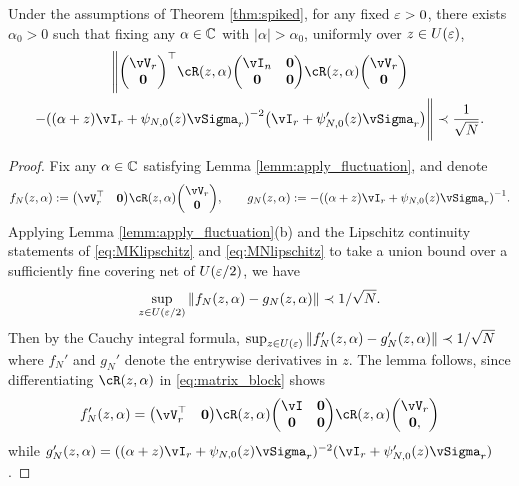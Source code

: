 \begin{lemma}\label{lemm:R(z,alph)^2}
Under the assumptions of Theorem
\ref{thm:spiked}, for any fixed $\varepsilon>0$, there exists $\alpha_0>0$ such
that fixing any $\alpha \in \mathbb{C}$ with $|\alpha|>\alpha_0$,
uniformly over $z \in U(\varepsilon)$,
\begin{multline*}
		\Bigg\|  \begin{pmatrix} \vV_r \\ \mathbf{0} \end{pmatrix}^\top
		\vcR(z,\alpha) 
		\begin{pmatrix} \vI_n & \mathbf{0}  \\
		\mathbf{0}   & \mathbf{0} 
		\end{pmatrix} 
		\vcR(z,\alpha) \begin{pmatrix} \vV_r \\ \mathbf{0} \end{pmatrix} \\
		 -\left((\alpha+z)\vI_r+\psi_{N,0}(z)\vSigma_r
		\right)^{-2}\left(\vI_r+\psi_{N,0}'(z)\vSigma_r\right) \Bigg\|\prec\frac{1}{\sqrt{N}}.
\end{multline*}

\end{lemma}
\begin{proof}
Fix any $\alpha \in \mathbb{C}$ satisfying Lemma \ref{lemm:apply_fluctuation}, and
denote
\[f_N(z,\alpha):=\begin{pmatrix}
	\vV_r^\top &\mathbf{0}
\end{pmatrix}\vcR(z,\alpha)\begin{pmatrix}
	\vV_r
	\\\mathbf{0}
\end{pmatrix}, \qquad
g_N(z,\alpha):=-\left((\alpha+z)\vI_r+\psi_{N,0}(z)\vSigma_r  \right)^{-1}.\]
Applying Lemma \ref{lemm:apply_fluctuation}(b) and
the Lipschitz continuity statements of
\eqref{eq:MKlipschitz} and \eqref{eq:MNlipschitz} to take a union bound over a
sufficiently fine covering net of $U(\varepsilon/2)$, we have
\[\sup_{z \in U(\varepsilon/2)} \|f_N(z,\alpha)-g_N(z,\alpha)\| \prec 1/\sqrt{N}.\]
Then by the Cauchy integral formula,
$\sup_{z \in U(\varepsilon)} \|f_N'(z,\alpha)-g_N'(z,\alpha)\| \prec 1/\sqrt{N}$
where $f_N'$ and $g_N'$ denote the entrywise derivatives in $z$. 
The lemma follows, since differentiating $\vcR(z,\alpha)$ in
\eqref{eq:matrix_block} shows
\[f_N'(z,\alpha)=\begin{pmatrix}
	\vV_r^\top &\mathbf{0}	
\end{pmatrix}\vcR(z,\alpha)
\begin{pmatrix} \vI & \mathbf{0} \\ \mathbf{0} & \mathbf{0} \end{pmatrix}
\vcR(z,\alpha)
\begin{pmatrix}
	\vV_r \\\mathbf{0},
\end{pmatrix}\]
while $g_N'(z,\alpha) = ((\alpha+z)\vI_r+\psi_{N,0}(z)\vSigma_r)^{-2}
(\vI_r+\psi_{N,0}'(z)\vSigma_r)$.
\end{proof}

